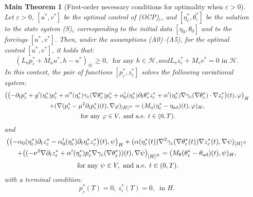 \documentclass{sinst}
\numberwithin{equation}{section}
\theoremstyle{plain}
\newtheorem{mTh}{Main Theorem}
\theoremstyle{definition}
\def\sH{\mathscr{H}}
\def\ad{{\rm ad}}
\begin{document}
\begin{mTh}[First-order necessary conditions for optimality when $\varepsilon > 0$] \label{mth3}
  Let $\varepsilon > 0$, $[u^*, v^*]$ be the optimal control of (OCP)$_\varepsilon$, and $[\eta_\varepsilon^*, \theta_\varepsilon^*]$ be the solution to the state system (S)$_\varepsilon$ corresponding to the initial data $[\eta_0, \theta_0]$ and to the forcings $[u^*, v^*]$. Then, under the assumptions (A0)--(A5), for the optimal control $[u^*, v^*]$, it holds that:
  \begin{subequations}\label{NC0}
    \begin{equation}
      (L_u p_\varepsilon^* + M_u u^*, h-u^*)_\sH \geq 0, \ \mbox{ for any } h \in \sH, \label{NC0a}
    \end{equation}
    and
    \begin{equation}
      L_v z_\varepsilon^* + M_v v^* = 0 \mbox{ in } \sH. \label{NC0b}
    \end{equation}
  \end{subequations}
  In this context, the pair of functions $[p_\varepsilon^*, z_\varepsilon^*]$ solves the following variational system:
  \begin{gather}
    \bigl(\bigl( -\partial_t p_\varepsilon^* + g'(\eta_\varepsilon^*)p_\varepsilon^* + \alpha''(\eta_\varepsilon^*) \gamma_\varepsilon(\nabla \theta_\varepsilon^*) p_\varepsilon^* + \alpha_0'(\eta_\varepsilon^*) \partial_t \theta_\varepsilon^* z_\varepsilon^* + \alpha'(\eta_\varepsilon^*) \nabla \gamma_\varepsilon(\nabla \theta_\varepsilon^*) \cdot \nabla z_\varepsilon^*\bigr)(t), \varphi\bigr)_H 
    \\
    + (\nabla (p_\varepsilon^* - \mu^2 \partial_t p_\varepsilon^*)(t), \nabla \varphi)_{[H]^N} = (M_\eta(\eta_\varepsilon^* - \eta_\ad)(t), \varphi)_H, \label{adj_1}
    \\
    \mbox{ for any } \varphi \in V, \mbox{ and a.e. } t \in (0,T).
  \end{gather}
  and
  \begin{gather}
    \bigl(\bigl( -\alpha_0(\eta_\varepsilon^*) \partial_t z_\varepsilon^* - \alpha_0'(\eta_\varepsilon^*) \partial_t \eta_\varepsilon^* z_\varepsilon^* \bigr)(t), \psi\bigr)_H + (\alpha(\eta_\varepsilon^*(t)) \nabla^2 \gamma_\varepsilon(\nabla \theta_\varepsilon^*(t)) \nabla z_\varepsilon^*(t), \nabla \psi)_{[H]^N}
    \\
    + \bigl((- \nu^2 \nabla \partial_t z_\varepsilon^* + \alpha'(\eta_\varepsilon^*) p_\varepsilon^*\nabla\gamma_\varepsilon(\nabla \theta_\varepsilon^*))(t) , \nabla \psi\bigr)_{[H]^N} = (M_\theta(\theta_\varepsilon^* - \theta_\ad)(t), \psi)_H,\label{adj_2}
    \\
     \mbox{ for any } \psi \in V, \mbox{ and a.e. } t \in (0,T).
  \end{gather}
  with a terminal condition:
  \begin{equation}
    p_\varepsilon^*(T) = 0, \ z_\varepsilon^*(T) = 0, \ \mbox{ in } H. \label{adj_3}
  \end{equation}
\end{mTh}
\end{document}
